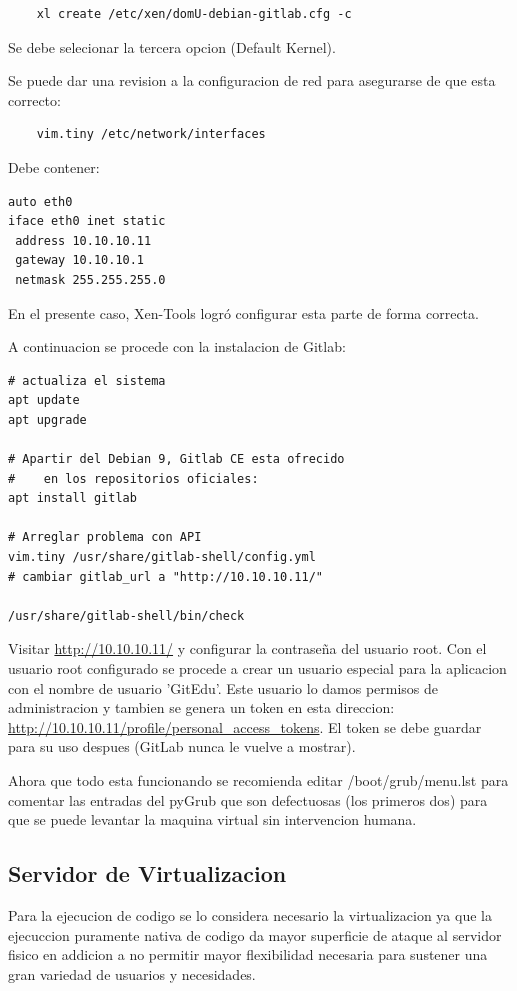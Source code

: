 \begin{lstlisting}
	xl create /etc/xen/domU-debian-gitlab.cfg -c
\end{lstlisting}

Se debe selecionar la tercera opcion (Default Kernel).

Se puede dar una revision a la configuracion de red para asegurarse de que esta correcto:

\begin{lstlisting}
	vim.tiny /etc/network/interfaces
\end{lstlisting}

Debe contener:

\begin{lstlisting}
auto eth0
iface eth0 inet static
 address 10.10.10.11
 gateway 10.10.10.1
 netmask 255.255.255.0
\end{lstlisting}

En el presente caso, Xen-Tools logró configurar esta parte de forma correcta.

A continuacion se procede con la instalacion de Gitlab:

\begin{lstlisting}
# actualiza el sistema
apt update
apt upgrade

# Apartir del Debian 9, Gitlab CE esta ofrecido
#    en los repositorios oficiales:
apt install gitlab

# Arreglar problema con API
vim.tiny /usr/share/gitlab-shell/config.yml
# cambiar gitlab_url a "http://10.10.10.11/"

/usr/share/gitlab-shell/bin/check
\end{lstlisting}

Visitar \url{http://10.10.10.11/} y configurar la contraseña del usuario root. Con el usuario root configurado se procede a crear un usuario especial para la aplicacion con el nombre de usuario 'GitEdu'. Este usuario lo damos permisos de administracion y tambien se genera un token en esta direccion: \url{http://10.10.10.11/profile/personal_access_tokens}. El token se debe guardar para su uso despues (GitLab nunca le vuelve a mostrar).

Ahora que todo esta funcionando se recomienda editar /boot/grub/menu.lst para comentar las entradas del pyGrub que son defectuosas (los primeros dos) para que se puede levantar la maquina virtual sin intervencion humana.


\pagebreak

\subsection{Servidor de Virtualizacion}
Para la ejecucion de codigo se lo considera necesario la virtualizacion ya que la ejecuccion puramente nativa de codigo da mayor superficie de ataque al servidor fisico en addicion a no permitir mayor flexibilidad necesaria para sustener una gran variedad de usuarios y necesidades.

